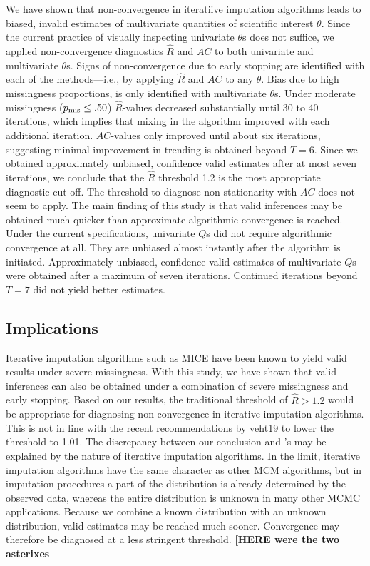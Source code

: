 \documentclass[Royal,times,sageh]{sagej}
\begin{document}
We have shown that non-convergence in iteratiive imputation algorithms leads to biased, invalid estimates of multivariate quantities of scientific interest \(\theta\). Since the current practice of visually inspecting univariate \(\theta\)s does not suffice, we applied non-convergence diagnostics \(\widehat{R}\) and \(AC\) to both univariate and multivariate \(\theta\)s. Signs of non-convergence due to early stopping are identified with each of the methods---i.e., by applying \(\widehat{R}\) and \(AC\) to any \(\theta\). Bias due to high missingness proportions, is only identified with multivariate \(\theta\)s. Under moderate missingness (\(p_{\rm mis}\leq.50\)) \(\widehat{R}\)-values decreased substantially until 30 to 40 iterations, which implies that mixing in the algorithm improved with each additional iteration. \(AC\)-values only improved until about six iterations, suggesting minimal improvement in trending is obtained beyond \(T=6\). Since we obtained approximately unbiased, confidence valid estimates after at most seven iterations, we conclude that the \(\widehat{R}\) threshold 1.2 is the most appropriate diagnostic cut-off. The threshold to diagnose non-stationarity with \(AC\) does not seem to apply. The main finding of this study is that valid inferences may be obtained much quicker than approximate algorithmic convergence is reached. Under the current specifications, univariate \(Q\)s did not require algorithmic convergence at all. They are unbiased almost instantly after the algorithm is initiated. Approximately unbiased, confidence-valid estimates of multivariate \(Q\)s were obtained after a maximum of seven iterations. Continued iterations beyond \(T = 7\) did not yield better estimates.

\hypertarget{implications}{%
\subsection{Implications}\label{implications}}

Iterative imputation algorithms such as MICE have been known to yield valid results under severe missingness. With this study, we have shown that valid inferences can also be obtained under a combination of severe missingness and early stopping. Based on our results, the traditional threshold of \(\widehat{R}> 1.2\) would be appropriate for diagnosing non-convergence in iterative imputation algorithms. This is not in line with the recent recommendations by veht19 to lower the threshold to 1.01. The discrepancy between our conclusion and \citet{veht19}'s may be explained by the nature of iterative imputation algorithms. In the limit, iterative imputation algorithms have the same character as other MCM algorithms, but in imputation procedures a part of the distribution is already determined by the observed data, whereas the entire distribution is unknown in many other MCMC applications. Because we combine a known distribution with an unknown distribution, valid estimates may be reached much sooner. Convergence may therefore be diagnosed at a less stringent threshold. \textbf{{[}HERE were the two asterixes{]}}
\end{document}
